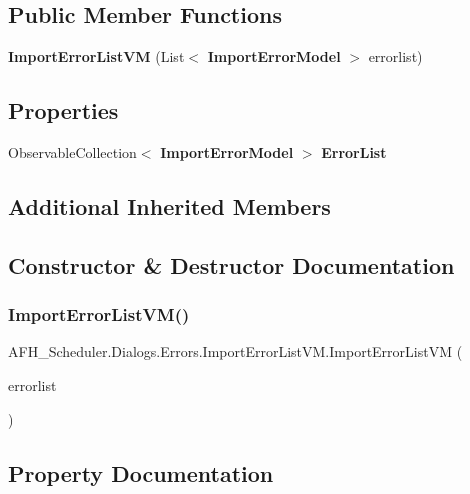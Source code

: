 \subsection*{Public Member Functions}
\begin{DoxyCompactItemize}
\item 
\textbf{ Import\+Error\+List\+VM} (List$<$ \textbf{ Import\+Error\+Model} $>$ errorlist)
\end{DoxyCompactItemize}
\subsection*{Properties}
\begin{DoxyCompactItemize}
\item 
Observable\+Collection$<$ \textbf{ Import\+Error\+Model} $>$ \textbf{ Error\+List}\hspace{0.3cm}{\ttfamily  [get, set]}
\end{DoxyCompactItemize}
\subsection*{Additional Inherited Members}


\subsection{Constructor \& Destructor Documentation}
\mbox{\label{class_a_f_h___scheduler_1_1_dialogs_1_1_errors_1_1_import_error_list_v_m_a5839947fb2b2b5fee35f67fe024f8612}} 
\subsubsection{ImportErrorListVM()}
{\footnotesize\ttfamily A\+F\+H\+\_\+\+Scheduler.\+Dialogs.\+Errors.\+Import\+Error\+List\+V\+M.\+Import\+Error\+List\+VM (\begin{DoxyParamCaption}\item[{List$<$ \textbf{ Import\+Error\+Model} $>$}]{errorlist }\end{DoxyParamCaption})}



\subsection{Property Documentation}
\mbox{\label{class_a_f_h___scheduler_1_1_dialogs_1_1_errors_1_1_import_error_list_v_m_a12f17f1aaff4656a26223890f30d8255}} 
